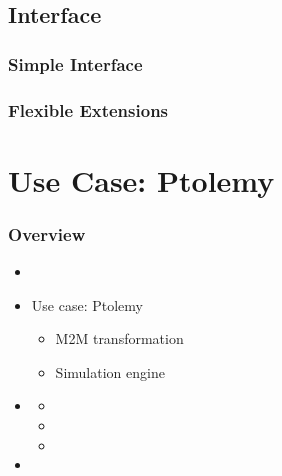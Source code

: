 \subsection[Interface]{Interface}
\begin{frame}
  \frametitle{Simple Interface}
  \begin{center} 
				\listingjava {} 
  \end{center}
\end{frame}

\begin{frame}
  \frametitle{Flexible Extensions}
  \begin{center} 
				\listingjava {} 
  \end{center}
\end{frame}


\section[Use Case: Ptolemy]{Use Case: Ptolemy}
\begin{frame}
  \frametitle{Overview}
    \begin{itemize}
	      \item {}
	      \item Use case: Ptolemy 
        \begin{itemize}
       	       \item M2M transformation
       	       \item Simulation engine
        \end{itemize}
	      \item {}
        \begin{itemize}
	            \item {}
	            \item {}
	            \item {}
        \end{itemize}
	      \item {}
    \end{itemize}
\end{frame}

